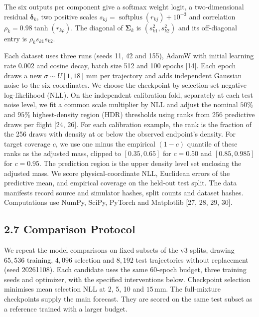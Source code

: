 The six outputs per component give a softmax weight logit, a two-dimensional residual $\boldsymbol\delta_k$, two positive scales $s_{kj}=\operatorname{softplus}(r_{kj})+10^{-3}$ and correlation $\rho_k=0.98\tanh(r_{k\rho})$. The diagonal of $\boldsymbol\Sigma_k$ is $(s_{k1}^2,s_{k2}^2)$ and its off-diagonal entry is $\rho_k s_{k1}s_{k2}$.

Each dataset uses three runs (seeds 11, 42 and 155), AdamW with initial learning rate $0.002$ and cosine decay, batch size 512 and 100 epochs [14]. Each epoch draws a new $\sigma\sim U[1,18]\,\mathrm{mm}$ per trajectory and adds independent Gaussian noise to the six coordinates. We choose the checkpoint by selection-set negative log-likelihood (NLL). On the independent calibration fold, separately at each test noise level, we fit a common scale multiplier by NLL and adjust the nominal $50\%$ and $95\%$ highest-density region (HDR) thresholds using ranks from 256 predictive draws per flight [24, 26]. For each calibration example, the rank is the fraction of the 256 draws with density at or below the observed endpoint's density. For target coverage $c$, we use one minus the empirical $(1-c)$ quantile of these ranks as the adjusted mass, clipped to $[0.35,0.65]$ for $c=0.50$ and $[0.85,0.985]$ for $c=0.95$. The prediction region is the upper density level set enclosing the adjusted mass. We score physical-coordinate NLL, Euclidean errors of the predictive mean, and empirical coverage on the held-out test split. The data manifests record source and simulator hashes, split counts and dataset hashes. Computations use NumPy, SciPy, PyTorch and Matplotlib [27, 28, 29, 30].

\subsection{2.7 Comparison Protocol}

We repeat the model comparisons on fixed subsets of the v3 splits, drawing $65{,}536$ training, $4{,}096$ selection and $8{,}192$ test trajectories without replacement (seed 20261108). Each candidate uses the same 60-epoch budget, three training seeds and optimizer, with the specified interventions below. Checkpoint selection minimises mean selection NLL at 2, 5, 10 and $15\,\mathrm{mm}$. The full-mixture checkpoints supply the main forecast. They are scored on the same test subset as a reference trained with a larger budget.

